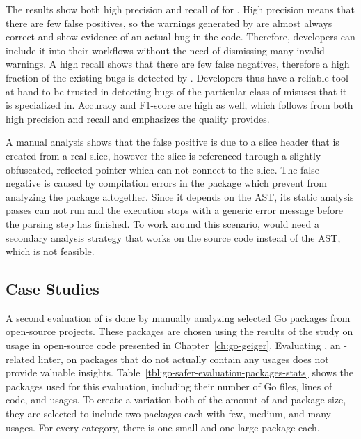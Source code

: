 

The results show both high precision and recall of  for \toolSafer{}.
High precision means that there are few false positives, so the warnings generated by \toolSafer{} are almost always
correct and show evidence of an actual bug in the code.
Therefore, developers can include it into their workflows without the need of dismissing many invalid warnings.
A high recall shows that there are few false negatives, therefore a high fraction of the existing bugs is detected by
\toolSafer{}.
Developers thus have a reliable tool at hand to be trusted in detecting bugs of the particular class of \unsafe{}
misuses that it is specialized in.
Accuracy and F1-score are high as well, which follows from both high precision and recall and emphasizes the quality
\toolSafer{} provides.

A manual analysis shows that the false positive is due to a slice header that is created from a real slice, however
the slice is referenced through a slightly obfuscated, reflected pointer which \toolSafer{} can not connect to the
slice.
The false negative is caused by compilation errors in the package which prevent \toolSafer{} from analyzing the package
altogether.
Since it depends on the \acrshort{AST}, its static analysis passes can not run and the execution stops with a generic
error message before the parsing step has finished.
To work around this scenario, \toolSafer{} would need a secondary analysis strategy that works on the source code
instead of the \acrshort{AST}, which is not feasible.



\subsection{Case Studies}\label{subsec:go-safer:evaluation:case-studies}

A second evaluation of \toolSafer{} is done by manually analyzing  selected Go packages from open-source
projects.
These packages are chosen using the results of the study on \unsafe{} usage in open-source code presented in
Chapter~\ref{ch:go-geiger}.
Evaluating \toolSafer{}, an \unsafe{}-related linter, on packages that do not actually contain any \unsafe{} usages does
not provide valuable insights.
Table~\ref{tbl:go-safer-evaluation-packages-stats} shows the  packages used for this evaluation, including
their number of Go files, lines of code, and \unsafe{} usages.
To create a variation both of the amount of \unsafe{} and package size, they are selected to include two packages
each with few, medium, and many \unsafe{} usages.
For every category, there is one small and one large package each.

